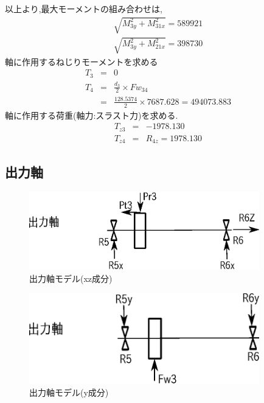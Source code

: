 以上より,最大モーメントの組み合わせは,
\begin{eqnarray}
  \sqrt{ M_{3y}^2 + M_{31x}^2 } = 589921\\
  \sqrt{ M_{3y}^2 + M_{21x}^2 } = 398730
\end{eqnarray}
軸に作用するねじりモーメントを求める
\begin{eqnarray}
T_{3} &=& 0\\
T_{4} &=& \frac{d_3}{2} \times Fw_{34}\\
      &=& \frac{128.5374}{2} \times 7687.628 = 494073.883
\end{eqnarray}
軸に作用する荷重(軸力:スラスト力)を求める.
\begin{eqnarray}
T_{z3} &=& -1978.130\\
T_{z4} &=& R_{4z} = 1978.130
\end{eqnarray}

\subsection{出力軸}
\begin{figure}[htbp]
\begin{center}
\includegraphics[width=10cm]{../picture/jiku3.eps}
\end{center}
\caption{出力軸モデル(xz成分)}
\end{figure}
\begin{figure}[htbp]
\begin{center}
\includegraphics[width=10cm]{../picture/jiku32.eps}
\end{center}
\caption{出力軸モデル(y成分)}
\end{figure}

